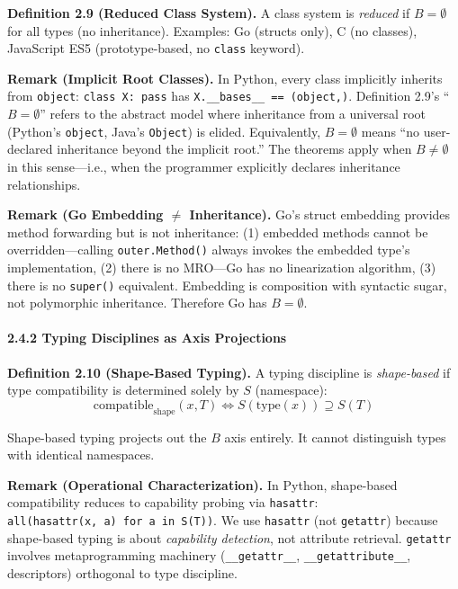 \textbf{Definition 2.9 (Reduced Class System).} A class system is
\emph{reduced} if \(B = \emptyset\) for all types (no inheritance).
Examples: Go (structs only), C (no classes), JavaScript ES5
(prototype-based, no \texttt{class} keyword).

\textbf{Remark (Implicit Root Classes).} In Python, every class
implicitly inherits from \texttt{object}: \texttt{class\ X:\ pass} has
\texttt{X.\_\_bases\_\_\ ==\ (object,)}. Definition 2.9's
``\(B = \emptyset\)'' refers to the abstract model where inheritance
from a universal root (Python's \texttt{object}, Java's \texttt{Object})
is elided. Equivalently, \(B = \emptyset\) means ``no user-declared
inheritance beyond the implicit root.'' The theorems apply when
\(B \neq \emptyset\) in this sense---i.e., when the programmer
explicitly declares inheritance relationships.

\textbf{Remark (Go Embedding $\neq$ Inheritance).} Go's struct embedding
provides method forwarding but is not inheritance: (1) embedded methods
cannot be overridden---calling \texttt{outer.Method()} always invokes
the embedded type's implementation, (2) there is no MRO---Go has no
linearization algorithm, (3) there is no \texttt{super()} equivalent.
Embedding is composition with syntactic sugar, not polymorphic
inheritance. Therefore Go has \(B = \emptyset\).

\paragraph{2.4.2 Typing Disciplines as Axis
Projections}\label{typing-disciplines-as-axis-projections}

\textbf{Definition 2.10 (Shape-Based Typing).} A typing discipline is
\emph{shape-based} if type compatibility is determined solely by \(S\)
(namespace):
\[\text{compatible}_{\text{shape}}(x, T) \iff S(\text{type}(x)) \supseteq S(T)\]

Shape-based typing projects out the \(B\) axis entirely. It cannot
distinguish types with identical namespaces.

\textbf{Remark (Operational Characterization).} In Python, shape-based
compatibility reduces to capability probing via \texttt{hasattr}:
\texttt{all(hasattr(x,\ a)\ for\ a\ in\ S(T))}. We use \texttt{hasattr}
(not \texttt{getattr}) because shape-based typing is about
\emph{capability detection}, not attribute retrieval. \texttt{getattr}
involves metaprogramming machinery (\texttt{\_\_getattr\_\_},
\texttt{\_\_getattribute\_\_}, descriptors) orthogonal to type
discipline.

